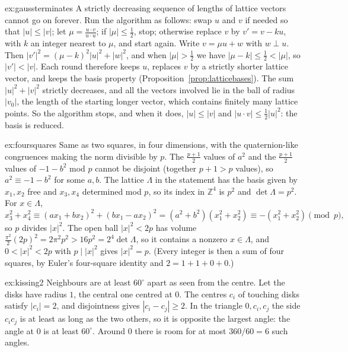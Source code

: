 \begin{solution}{ex:gaussterminates}
\idea A strictly decreasing sequence of lengths of lattice vectors cannot go on forever.
\writeup Run the algorithm as follows: swap $u$ and $v$ if needed so that $|u|\le|v|$; let $\mu=\frac{u\cdot v}{u\cdot u}$; if $|\mu|\le\frac12$, stop;
otherwise replace $v$ by $v'=v-ku$, with $k$ an integer nearest to $\mu$, and start again. Write $v=\mu u+w$ with $w\perp u$. Then
$|v'|^2=(\mu-k)^2|u|^2+|w|^2$, and when $|\mu|>\frac12$ we have $|\mu-k|\le\frac12<|\mu|$, so $|v'|<|v|$. Each round therefore keeps $u$, replaces $v$ by a
strictly shorter lattice vector, and keeps the basis property (Proposition~\ref{prop:latticebases}). The sum $|u|^2+|v|^2$ strictly decreases, and all the vectors
involved lie in the ball of radius $|v_0|$, the length of the starting longer vector, which contains finitely many lattice points. So the algorithm stops, and
when it does, $|u|\le|v|$ and $|u\cdot v|\le\frac12|u|^2$: the basis is reduced.
\end{solution}

\begin{solution}{ex:foursquares}
\idea Same as two squares, in four dimensions, with the quaternion-like congruences making the norm divisible by $p$.
\writeup The $\frac{p+1}2$ values of $a^2$ and the $\frac{p+1}2$ values of $-1-b^2$ mod $p$ cannot be disjoint (together $p+1>p$ values), so $a^2\equiv-1-b^2$ for some
$a,b$. The lattice $\Lambda$ in the statement has the basis given by $x_1,x_2$ free and $x_3,x_4$ determined mod $p$, so its index in $\mathbb Z^4$ is $p^2$ and
$\det\Lambda=p^2$. For $x\in\Lambda$,
\[
x_3^2+x_4^2\equiv(ax_1+bx_2)^2+(bx_1-ax_2)^2=(a^2+b^2)(x_1^2+x_2^2)\equiv-(x_1^2+x_2^2)\pmod p,
\]
so $p$ divides $|x|^2$. The open ball $|x|^2<2p$ has volume $\frac{\pi^2}2(2p)^2=2\pi^2p^2>16p^2=2^4\det\Lambda$, so it contains a nonzero $x\in\Lambda$, and
$0<|x|^2<2p$ with $p\mid|x|^2$ gives $|x|^2=p$. (Every integer is then a sum of four squares, by Euler's four-square identity and $2=1+1+0+0$.)
\end{solution}

\begin{solution}{ex:kissing2}
\idea Neighbours are at least $60^\circ$ apart as seen from the centre.
\writeup Let the disks have radius $1$, the central one centred at $0$. The centres $c_i$ of touching disks satisfy $|c_i|=2$, and disjointness gives
$|c_i-c_j|\ge2$. In the triangle $0,c_i,c_j$ the side $c_ic_j$ is at least as long as the two others, so it is opposite the largest angle: the angle at $0$ is
at least $60^\circ$. Around $0$ there is room for at most $360/60=6$ such angles.
\end{solution}

